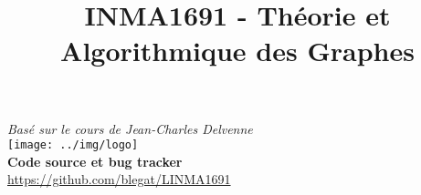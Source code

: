 

\title{INMA1691 - Théorie et Algorithmique des Graphes}




\maketitle
\begin{center}
  \vspace{-5mm}
  \textit{Basé sur le cours de Jean-Charles Delvenne}\\
  \texttt{[image: ../img/logo]}\\
  \textbf{Code source et bug tracker}\\
  \url{https://github.com/blegat/LINMA1691}
\end{center}
\newpage
\clearpage

\tableofcontents
\newpage


\newcommand{\addTODO}
{
  \textcolor{red}{TODO}\stepcounter{todo_\thesection}
}

\newcommand{\Chapitredone}[2]
{
  \ifnum#1=0
    Chapitre #2 terminé!
  \else
    \textbf{#1} dans le Chapitre #2
  \fi
}
\newcommand{\username}[2]
{
  \textit{\textbf{#1}} $\longleftrightarrow$ \textbf{#2}
}














\clearpage
